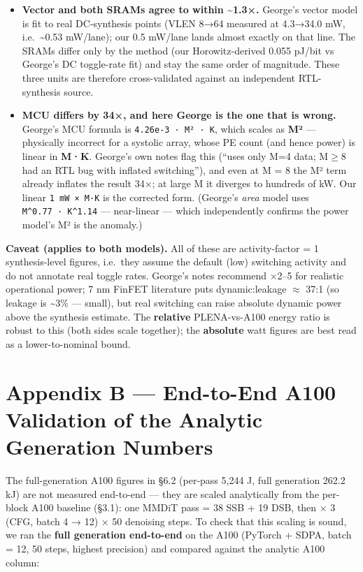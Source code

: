\documentclass[
  10pt,
]{article}
\begin{document}
\begin{itemize}
\item
  \textbf{Vector and both SRAMs agree to within \textasciitilde1.3×.}
  George's vector model is fit to real DC-synthesis points (VLEN 8→64
  measured at 4.3→34.0 mW, i.e.~\textasciitilde0.53 mW/lane); our 0.5
  mW/lane lands almost exactly on that line. The SRAMs differ only by
  the method (our Horowitz-derived 0.055 pJ/bit vs George's DC
  toggle-rate fit) and stay the same order of magnitude. These three
  units are therefore cross-validated against an independent
  RTL-synthesis source.
\item
  \textbf{MCU differs by 34×, and here George is the one that is wrong.}
  George's MCU formula is \texttt{4.26e-3\ ·\ M²\ ·\ K}, which scales as
  \textbf{M²} --- physically incorrect for a systolic array, whose PE
  count (and hence power) is linear in \textbf{M·K}. George's own notes
  flag this (``uses only M=4 data; M\(\geq\)8 had an RTL bug with inflated
  switching''), and even at M = 8 the M² term already inflates the
  result 34×; at large M it diverges to hundreds of kW. Our linear
  \texttt{1\ mW\ ×\ M·K} is the corrected form. (George's \emph{area}
  model uses \texttt{M\^{}0.77\ ·\ K\^{}1.14} --- near-linear --- which
  independently confirms the power model's M² is the anomaly.)
\end{itemize}

\textbf{Caveat (applies to both models).} All of these are
activity-factor = 1 synthesis-level figures, i.e.~they assume the
default (low) switching activity and do not annotate real toggle rates.
George's notes recommend ×2--5 for realistic operational power; 7 nm
FinFET literature puts dynamic:leakage \(\approx\) 37:1 (so leakage is
\textasciitilde3\% --- small), but real switching can raise absolute
dynamic power above the synthesis estimate. The \textbf{relative}
PLENA-vs-A100 energy ratio is robust to this (both sides scale
together); the \textbf{absolute} watt figures are best read as a
lower-to-nominal bound.


\section{Appendix B --- End-to-End A100 Validation of the Analytic
Generation Numbers}\label{appendix-b-end-to-end-validation}

The full-generation A100 figures in §6.2 (per-pass 5,244 J, full generation
262.2 kJ) are not measured end-to-end — they are scaled analytically from
the per-block A100 baseline (§3.1): one MMDiT pass = 38 SSB + 19 DSB, then
× 3 (CFG, batch 4 → 12) × 50 denoising steps. To check that this scaling is
sound, we ran the \textbf{full generation end-to-end} on the A100 (PyTorch
+ SDPA, batch = 12, 50 steps, highest precision) and compared against the
analytic A100 column:
\end{document}
